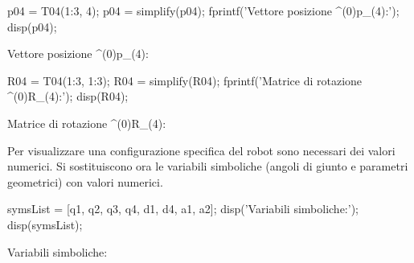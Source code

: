 \documentclass[11pt, a4paper]{article}
\begin{document}
\begin{matlabcode}
p04 = T04(1:3, 4);
p04 = simplify(p04);
fprintf('Vettore posizione ^(0)p_(4):\n');
disp(p04);
\end{matlabcode}
\begin{matlaboutput}
Vettore posizione ^(0)p_(4):
\end{matlaboutput}

\begin{matlabcode}
R04 = T04(1:3, 1:3);
R04 = simplify(R04);
fprintf('Matrice di rotazione ^(0)R_(4):\n');
disp(R04);
\end{matlabcode}
\begin{matlaboutput}
Matrice di rotazione ^(0)R_(4):
\end{matlaboutput}

\newpage
\begin{par}
\begin{flushleft}
Per visualizzare una configurazione specifica del robot sono necessari dei valori numerici. Si sostituiscono ora le variabili simboliche (angoli di giunto e parametri geometrici) con valori numerici.
\end{flushleft}
\end{par}

\begin{matlabcode}
symsList = [q1, q2, q3, q4, d1, d4, a1, a2];
disp('Variabili simboliche:');
disp(symsList);
\end{matlabcode}
\begin{matlaboutput}
Variabili simboliche:
\end{matlaboutput}
\end{document}
